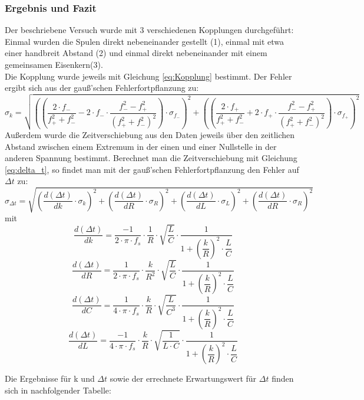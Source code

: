 \documentclass[12pt,a4paper]{article}
\begin{document}
\subsubsection{Ergebnis und Fazit}
Der beschriebene Versuch wurde mit 3 verschiedenen Kopplungen durchgeführt: Einmal wurden die Spulen direkt nebeneinander gestellt (1), einmal mit etwa einer handbreit Abstand (2) und einmal direkt nebeneinander mit einem gemeinsamen Eisenkern(3). \\
Die Kopplung wurde jeweils mit Gleichung \ref{eq:Kopplung} bestimmt. Der Fehler ergibt sich aus der gauß'schen Fehlerfortpflanzung zu:
\begin{equation}
\sigma_k = \sqrt{\left( \left( \dfrac{2 \cdot f_-}{f_+^2 + f_-^2} - 2 \cdot f_- \cdot \dfrac{f_-^2 - f_+^2}{(f_+^2 + f_-^2)^2} \right) \cdot \sigma_{f_-} \right)^2 + \left( \left( \dfrac{2 \cdot f_+}{f_+^2 + f_-^2} + 2 \cdot f_+ \cdot \dfrac{f_-^2 - f_+^2}{(f_+^2 + f_-^2)^2} \right) \cdot \sigma_{f_+} \right)^2}
\label{eq:Kopplung_k}
\end{equation}
Außerdem wurde die Zeitverschiebung aus den Daten jeweils über den zeitlichen Abstand zwischen einem Extremum in der einen und einer Nullstelle in der anderen Spannung bestimmt. Berechnet man die Zeitverschiebung mit Gleichung \ref{eq:delta_t}, so findet man mit der gauß'schen Fehlerfortpflanzung den Fehler auf $\Delta t$ zu:
\begin{equation}
\sigma_{\Delta t} = \sqrt{\left( \dfrac{d(\Delta t)}{dk} \cdot \sigma_k \right)^2 + \left( \dfrac{d(\Delta t)}{dR} \cdot \sigma_R \right)^2 + \left( \dfrac{d(\Delta t)}{dL} \cdot \sigma_L \right)^2 + \left( \dfrac{d(\Delta t)}{dR} \cdot \sigma_R \right)^2}
\end{equation}
mit
\[\dfrac{d(\Delta t)}{dk} = \dfrac{-1}{2 \cdot \pi \cdot f_s} \cdot \dfrac{1}{R} \cdot \sqrt{\dfrac{L}{C}} \cdot \dfrac{1}{1 + \left( \dfrac{k}{R} \right)^2 \cdot \dfrac{L}{C}} \]
\[\dfrac{d(\Delta t)}{dR} = \dfrac{1}{2 \cdot \pi \cdot f_s} \cdot \dfrac{k}{R^2} \cdot \sqrt{\dfrac{L}{C}} \cdot \dfrac{1}{1 + \left( \dfrac{k}{R} \right)^2 \cdot \dfrac{L}{C}} \]
\[\dfrac{d(\Delta t)}{dC} = \dfrac{1}{4 \cdot \pi \cdot f_s} \cdot \dfrac{k}{R} \cdot \sqrt{\dfrac{L}{C^3}} \cdot \dfrac{1}{1 + \left( \dfrac{k}{R} \right)^2 \cdot \dfrac{L}{C}} \]
\[\dfrac{d(\Delta t)}{dL} = \dfrac{-1}{4 \cdot \pi \cdot f_s} \cdot \dfrac{k}{R} \cdot \sqrt{\dfrac{1}{L \cdot C}} \cdot \dfrac{1}{1 + \left( \dfrac{k}{R} \right)^2 \cdot \dfrac{L}{C}} \]

Die Ergebnisse für k und $\Delta t$ sowie der errechnete Erwartungswert für $\Delta t$ finden sich in nachfolgender Tabelle: \\
\end{document}
